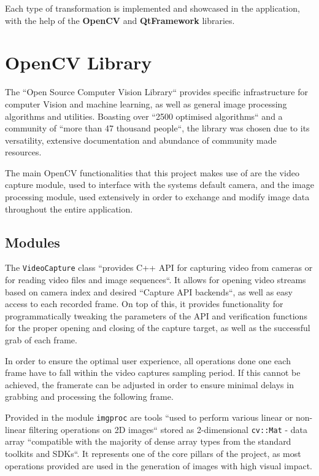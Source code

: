 Each type of transformation is implemented and showcased in the application, with the help of the
\textbf{OpenCV} and \textbf{QtFramework} libraries.

\section{OpenCV Library}

The ``Open Source Computer Vision Library`` provides specific infrastructure for computer Vision and
machine learning, as well as general image processing algorithms and utilities. Boasting over ``2500
optimised algorithms`` and a community of ``more than 47 thousand people``, the library was chosen
due to its versatility, extensive documentation and abundance of community made resources. \cite{opencvAbout}

The main OpenCV functionalities that this project makes use of are the video capture module, used
to interface with the systems default camera, and the image processing module, used extensively in
order to exchange and modify image data throughout the entire application.

\subsection{Modules}

The \verb|VideoCapture| class ``provides C++ API for capturing video from cameras or for reading video
files and image sequences``. It allows for opening video streams based on camera index and desired
``Capture API backends``, as well as easy access to each recorded frame. On top of this, it provides
functionality for programmatically tweaking the parameters of the API and verification functions
for the proper opening and closing of the capture target, as well as the successful grab of each frame.
\cite{opencvVideoCapture}

In order to ensure the optimal user experience, all operations done one each frame have to fall within
the video captures sampling period. If this cannot be achieved, the framerate can be adjusted in order
to ensure minimal delays in grabbing and processing the following frame.

Provided in the module \verb|imgproc| are tools ``used to perform various linear or non-linear filtering
operations on 2D images`` stored as 2-dimensional \verb|cv::Mat| - data array ``compatible with the
majority of dense array types from the standard toolkits and SDKs``.  It represents one of the core
pillars of the project, as most operations provided are used in the generation of images with high
visual impact. \cite{opencvImproc}

